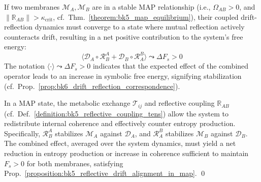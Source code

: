 \begin{proposition}
\label{proposition:bk5_reflective_drift_alignment_in_map}
If two membranes $\mathscr{M}_A, \mathscr{M}_B$ are in a stable MAP relationship (i.e., $\Omega_{AB}>0$, and $\|\mathbb{R}_{AB}\| > \kappa_{\text{crit}}$, cf.~Thm.~\ref{theorem:bk5_map_equilibrium}), their coupled drift-reflection dynamics must converge to a state where mutual reflection actively counteracts drift, resulting in a net positive contribution to the system's free energy:
\begin{equation}
\langle \mathcal{D}_A \circ \mathcal{R}_B^A + \mathcal{D}_B \circ \mathcal{R}_A^B \rangle \leadsto \Delta F_s > 0
\end{equation}
The notation $\langle \cdot \rangle \leadsto \Delta F_s > 0$ indicates that the expected effect of the combined operator leads to an increase in symbolic free energy, signifying stabilization (cf.~Prop.~\ref{prop:bk6_drift_reflection_correspondence}).
\end{proposition}

\begin{demonstratio}
\label{demonstratio:bk5_entropy_reduction}
In a MAP state, the metabolic exchange $\mathcal{T}_{ij}$ and reflective coupling $\mathbb{R}_{AB}$ (cf.~Def.~\ref{definition:bk5_reflective_coupling_tens}) allow the system to redistribute internal coherence and effectively counter entropy production. Specifically, $\mathcal{R}_B^A$ stabilizes $\mathscr{M}_A$ against $\mathcal{D}_A$, and $\mathcal{R}_A^B$ stabilizes $\mathscr{M}_B$ against $\mathcal{D}_B$. The combined effect, averaged over the system dynamics, must yield a net reduction in entropy production or increase in coherence sufficient to maintain $F_s > 0$ for both membranes, satisfying Prop.~\ref{proposition:bk5_reflective_drift_alignment_in_map}. \qed
\end{demonstratio}

